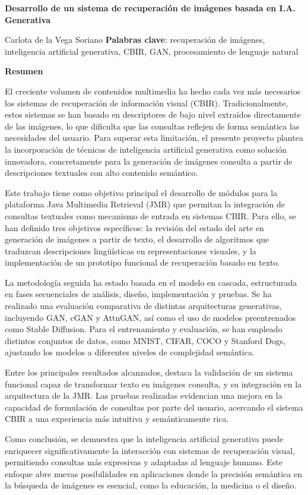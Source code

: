 \centering
\textbf{Desarrollo de un sistema de recuperación de imágenes basada en I.A. Generativa}
\vspace{0.5cm}

Carlota de la Vega Soriano
\vspace{0.5cm}
\justify
\textbf{Palabras clave}: recuperación de imágenes, inteligencia artificial generativa, CBIR, GAN, procesamiento de lenguaje natural
\vspace{1cm} 

\justify   
\textbf{Resumen}

El creciente volumen de contenidos multimedia ha hecho cada vez más necesarios los sistemas de recuperación de información visual (CBIR). Tradicionalmente, estos sistemas se han basado en descriptores de bajo nivel extraídos directamente de las imágenes, lo que dificulta que las consultas reflejen de forma semántica las necesidades del usuario. Para superar esta limitación, el presente proyecto plantea la incorporación de técnicas de inteligencia artificial generativa como solución innovadora, concretamente para la generación de imágenes consulta a partir de descripciones textuales con alto contenido semántico.

Este trabajo tiene como objetivo principal el desarrollo de módulos para la plataforma Java Multimedia Retrieval (JMR) que permitan la integración de consultas textuales como mecanismo de entrada en sistemas CBIR. Para ello, se han definido tres objetivos específicos: la revisión del estado del arte en generación de imágenes a partir de texto, el desarrollo de algoritmos que traduzcan descripciones lingüísticas en representaciones visuales, y la implementación de un prototipo funcional de recuperación basado en texto.

La metodología seguida ha estado basada en el modelo en cascada, estructurada en fases secuenciales de análisis, diseño, implementación y pruebas. Se ha realizado una evaluación comparativa de distintas arquitecturas generativas, incluyendo GAN, cGAN y AttnGAN, así como el uso de modelos preentrenados como Stable Diffusion. Para el entrenamiento y evaluación, se han empleado distintos conjuntos de datos, como MNIST, CIFAR, COCO y Stanford Dogs, ajustando los modelos a diferentes niveles de complejidad semántica.

Entre los principales resultados alcanzados, destaca la validación de un sistema funcional capaz de transformar texto en imágenes consulta, y su integración en la arquitectura de la JMR. Las pruebas realizadas evidencian una mejora en la capacidad de formulación de consultas por parte del usuario, acercando el sistema CBIR a una experiencia más intuitiva y semánticamente rica.

Como conclusión, se demuestra que la inteligencia artificial generativa puede enriquecer significativamente la interacción con sistemas de recuperación visual, permitiendo consultas más expresivas y adaptadas al lenguaje humano. Este enfoque abre nuevas posibilidades en aplicaciones donde la precisión semántica en la búsqueda de imágenes es esencial, como la educación, la medicina o el diseño.
